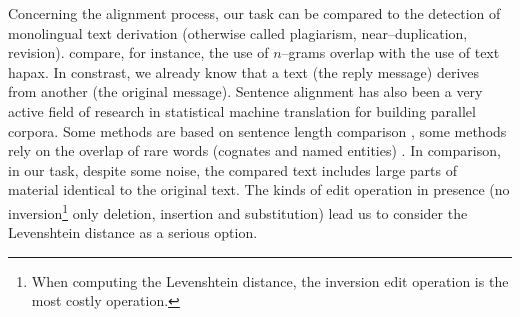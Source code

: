 Concerning the alignment process, our task can be compared to the detection of monolingual text derivation (otherwise called plagiarism, near–duplication, revision). \cite{poulard:2011:detecting} compare, for instance, the use of $n$–grams overlap with the use of text hapax. 
In constrast, we already know that a text (the reply message) derives from another (the original message). Sentence alignment has also been a very active field of research 
in statistical machine translation for building parallel corpora. %
%
Some methods are based on sentence length comparison \cite{gale:1991}, some methods rely on the overlap of rare words (cognates and named entities) \cite{enright-kondrak:2007:ShortPapers}.
In comparison, %
in our task, despite some noise, the compared text includes large parts of material identical to the original text. 
The kinds of edit operation in presence (no inversion\footnote{When computing the Levenshtein distance, the inversion edit operation is the most costly operation.} only deletion, insertion and substitution) lead us to consider the Levenshtein distance as a serious option.  


